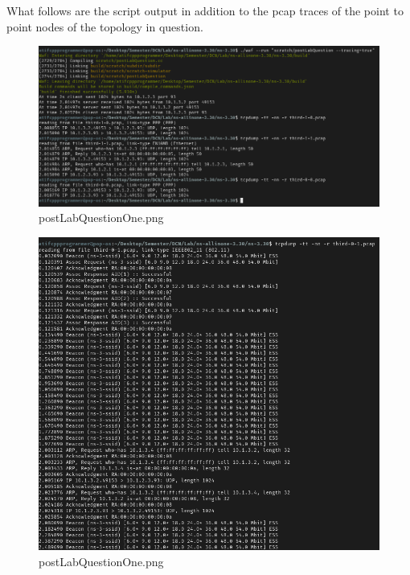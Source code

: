 \documentclass[fullpage]{article}
\begin{document}
What follows are the script output in addition to the pcap traces of the point to
point nodes of the topology in question.

\begin{figure}[H]
  \includegraphics[width=\linewidth]{postLabQuestionOne.png}
  \caption{postLabQuestionOne.png}
  \label{fig:output3}
\end{figure}

\begin{figure}[H]
\includegraphics[width=\linewidth]{postLabQuestionTwo.png}
\caption{postLabQuestionOne.png}
\label{fig:output3}
\end{figure}
\end{document}
